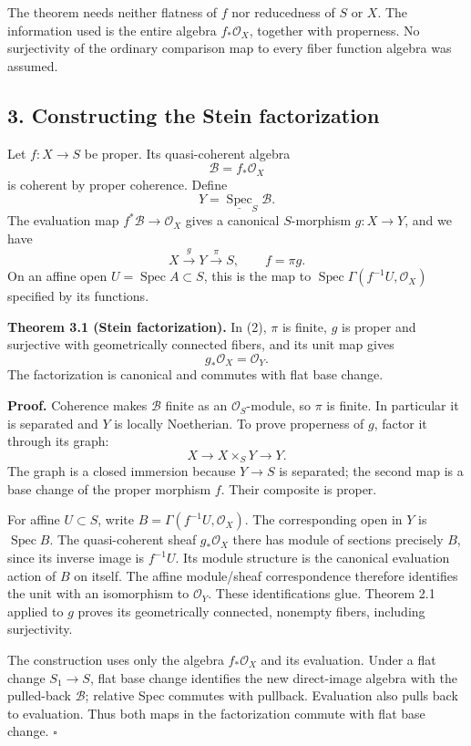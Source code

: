 \documentclass[11pt]{article}
\begin{document}
The theorem needs neither flatness of \(f\) nor reducedness of \(S\) or
\(X\). The information used is the entire algebra \(f_*\mathcal O_X\),
together with properness. No surjectivity of the ordinary comparison map
to every fiber function algebra was assumed.

\subsection{3. Constructing the Stein
factorization}\label{constructing-the-stein-factorization}

Let \(f:X\to S\) be proper. Its quasi-coherent algebra \[
\mathcal B=f_*\mathcal O_X
\] is coherent by proper coherence. Define \[
Y=\underline{\operatorname{Spec}}_S\mathcal B.
\] The evaluation map \(f^*\mathcal B\to\mathcal O_X\) gives a canonical
\(S\)-morphism \(g:X\to Y\), and we have \[
X\xrightarrow{g}Y\xrightarrow{\pi}S,\qquad f=\pi g.
\tag{2}
\] On an affine open \(U=\operatorname{Spec}A\subset S\), this is the
map to \(\operatorname{Spec}\Gamma(f^{-1}U,\mathcal O_X)\) specified by
its functions.

\textbf{Theorem 3.1 (Stein factorization).} In (2), \(\pi\) is finite,
\(g\) is proper and surjective with geometrically connected fibers, and
its unit map gives \[
g_*\mathcal O_X=\mathcal O_Y.
\] The factorization is canonical and commutes with flat base change.

\textbf{Proof.} Coherence makes \(\mathcal B\) finite as an
\(\mathcal O_S\)-module, so \(\pi\) is finite. In particular it is
separated and \(Y\) is locally Noetherian. To prove properness of \(g\),
factor it through its graph: \[
X\longrightarrow X\times_S Y\longrightarrow Y.
\] The graph is a closed immersion because \(Y\to S\) is separated; the
second map is a base change of the proper morphism \(f\). Their
composite is proper.

For affine \(U\subset S\), write \(B=\Gamma(f^{-1}U,\mathcal O_X)\). The
corresponding open in \(Y\) is \(\operatorname{Spec}B\). The
quasi-coherent sheaf \(g_*\mathcal O_X\) there has module of sections
precisely \(B\), since its inverse image is \(f^{-1}U\). Its module
structure is the canonical evaluation action of \(B\) on itself. The
affine module/sheaf correspondence therefore identifies the unit with an
isomorphism to \(\mathcal O_Y\). These identifications glue. Theorem 2.1
applied to \(g\) proves its geometrically connected, nonempty fibers,
including surjectivity.

The construction uses only the algebra \(f_*\mathcal O_X\) and its
evaluation. Under a flat change \(S_1\to S\), flat base change
identifies the new direct-image algebra with the pulled-back
\(\mathcal B\); relative Spec commutes with pullback. Evaluation also
pulls back to evaluation. Thus both maps in the factorization commute
with flat base change. \(\square\)
\end{document}
